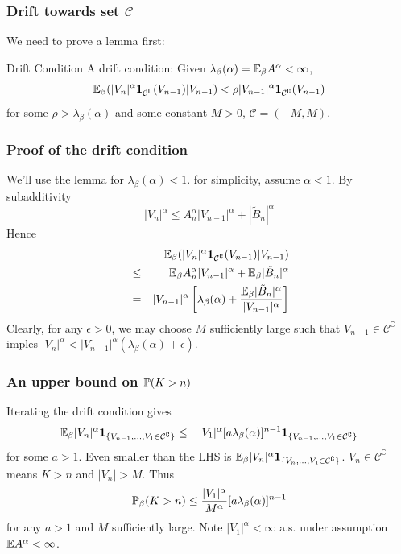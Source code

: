 \documentclass{beamer}
\begin{document}
\begin{frame}
  \frametitle{Drift towards set $\mathcal C$}
  We need to prove a lemma first:
  \begin{exampleblock}{Drift Condition}
    A drift condition: Given $\lambda_\beta(\alpha) = \E_\beta
    A^\alpha < \infty$,
    \[
    \E_\beta (|V_n|^\alpha \I{\mathcal C^\complement}(V_{n-1}) |
    V_{n-1}) < \rho |V_{n-1}|^\alpha\I{\mathcal C^\complement}(V_{n-1})
    \]
    for some $\rho > \lambda_\beta(\alpha)$ and some constant $M > 0$,
    $\mathcal C = (-M, M)$.
  \end{exampleblock}
\end{frame}

\begin{frame}
  \frametitle{Proof of the drift condition}
  We'll use the lemma for $\lambda_\beta(\alpha) < 1$. for
  simplicity, assume $\alpha < 1$. By subadditivity
  \[
  |V_n|^\alpha \leq A_n^\alpha |V_{n-1}|^\alpha + |\tilde B_n|^\alpha
  \]
  Hence
  \begin{eqnarray*}
    && \E_\beta (|V_n|^\alpha \I{\mathcal C^\complement}(V_{n-1})
    | V_{n-1}) \\
    &\leq& \E_\beta A_n^\alpha |V_{n-1}|^\alpha +
    \E_\beta |\tilde B_n|^\alpha \\
    &=& |V_{n-1}|^\alpha \left[
      \lambda_\beta(\alpha) + {
        \E_\beta |\tilde B_n|^\alpha
        \over
        |V_{n-1}|^\alpha
      }
    \right]
  \end{eqnarray*}
  Clearly, for any $\epsilon > 0$, we may choose $M$ sufficiently
  large such that $V_{n-1} \in \mathcal C^\complement$ imples
  $|V_n|^\alpha < |V_{n-1}|^\alpha (\lambda_\beta (\alpha) + \epsilon)$.
\end{frame}

\begin{frame}
  \frametitle{An upper bound on $\P(K > n)$}
  Iterating the drift condition gives
  \begin{eqnarray*}
    \E_\beta |V_n|^\alpha
    \1{V_{n-1}, \dots, V_1 \in \mathcal C^\complement}
    &\leq& |V_1|^\alpha [a \lambda_\beta(\alpha)]^{n-1}
    \1{V_{n-1}, \dots, V_1 \in \mathcal C^\complement}
  \end{eqnarray*}
  for some $a > 1$. Even smaller than the LHS is $\E_\beta |V_n|^\alpha
  \1{V_n, \dots, V_1 \in \mathcal C^\complement}$. $V_n \in \mathcal
  C^\complement$ means $K > n$ and $|V_n| > M$. Thus
  \[
  \P_\beta(K > n) \leq {
    |V_1|^\alpha
    \over
    M^\alpha
  } [a \lambda_\beta(\alpha)]^{n-1}
  \]
  for any $a > 1$ and $M$ sufficiently large. Note $|V_1|^\alpha <
  \infty$ a.s. under assumption $\E A^\alpha < \infty$.
\end{frame}
\end{document}
